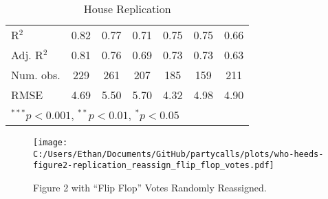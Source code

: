 \documentclass[12pt]{article}
\begin{document}
\begin{table}
\begin{center}
\begin{tabular}{l c c c c c c }
			\hline
			R$^2$                       & 0.82          & 0.77          & 0.71           & 0.75           & 0.75           & 0.66           \\
			Adj. R$^2$                  & 0.81          & 0.76          & 0.69           & 0.73           & 0.73           & 0.63           \\
			Num. obs.                   & 229           & 261           & 207            & 185            & 159            & 211            \\
			RMSE                        & 4.69          & 5.50          & 5.70           & 4.32           & 4.98           & 4.90           \\
			\hline
			\multicolumn{7}{l}{\scriptsize{$^{***}p<0.001$, $^{**}p<0.01$, $^*p<0.05$}}
		\end{tabular}
		\caption{House Replication}
		\label{table:house coefficients}
	\end{center}
\end{table}

\begin{figure}[h]
	\caption{Figure 2 with ``Flip Flop'' Votes Randomly Reassigned.}
	\centering
	\texttt{[image: C:/Users/Ethan/Documents/GitHub/partycalls/plots/who-heeds-figure2-replication\_reassign\_flip\_flop\_votes.pdf]}
	
\end{figure}
	
	
	
	
	
	
\end{document}

